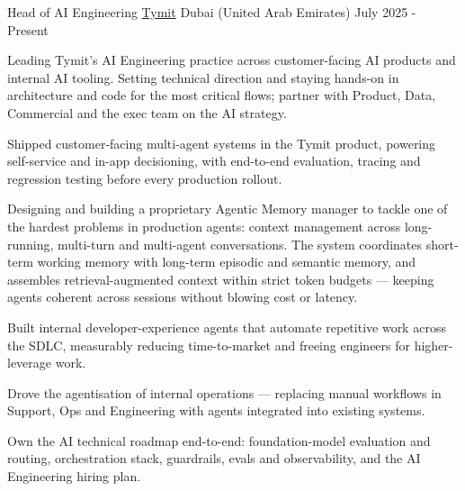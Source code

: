 

\begin{cventries}

  \cventry
    {Head of AI Engineering} %
    {\href{https://tymit.com}{Tymit}} %
    {Dubai (United Arab Emirates)} %
    {July 2025 - Present} %
    {
      \begin{cvitems} %
        \item[] Leading Tymit's AI Engineering practice across customer-facing AI products and internal AI tooling. Setting technical direction and staying hands-on in architecture and code for the most critical flows; partner with Product, Data, Commercial and the exec team on the AI strategy.
        \item[]
        \item[] Shipped customer-facing multi-agent systems in the Tymit product, powering self-service and in-app decisioning, with end-to-end evaluation, tracing and regression testing before every production rollout.
        \item[]
        \item[] Designing and building a proprietary Agentic Memory manager to tackle one of the hardest problems in production agents: context management across long-running, multi-turn and multi-agent conversations. The system coordinates short-term working memory with long-term episodic and semantic memory, and assembles retrieval-augmented context within strict token budgets — keeping agents coherent across sessions without blowing cost or latency.
        \item[]
        \item[] Built internal developer-experience agents that automate repetitive work across the SDLC, measurably reducing time-to-market and freeing engineers for higher-leverage work.
        \item[]
        \item[] Drove the agentisation of internal operations — replacing manual workflows in Support, Ops and Engineering with agents integrated into existing systems.
        \item[]
        \item[] Own the AI technical roadmap end-to-end: foundation-model evaluation and routing, orchestration stack, guardrails, evals and observability, and the AI Engineering hiring plan.
      \end{cvitems}
    }


\end{cventries}
